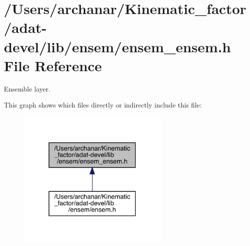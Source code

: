 \hypertarget{adat-devel_2lib_2ensem_2ensem__ensem_8h}{}\section{/\+Users/archanar/\+Kinematic\+\_\+factor/adat-\/devel/lib/ensem/ensem\+\_\+ensem.h File Reference}
\label{adat-devel_2lib_2ensem_2ensem__ensem_8h}


Ensemble layer.  


This graph shows which files directly or indirectly include this file\+:
\nopagebreak
\begin{figure}[H]
\begin{center}
\leavevmode
\includegraphics[width=214pt]{de/dcb/adat-devel_2lib_2ensem_2ensem__ensem_8h__dep__incl}
\end{center}
\end{figure}
